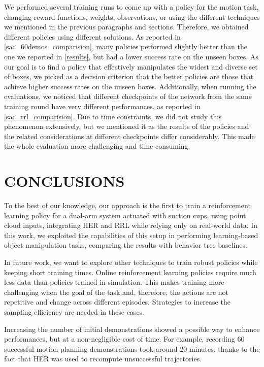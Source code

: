 \documentclass[letterpaper, 10 pt, conference]{ieeeconf}  %
\begin{document}
We performed several training runs to come up with a policy for the motion task, changing reward functions, weights, observations, or using the different techniques we mentioned in the previous paragraphs and sections.
Therefore, we obtained different policies using different solutions.
As reported in \cref{sac_60demos_comparision}, many policies performed slightly better than the one we reported in \cref{results}, but had a lower success rate on the unseen boxes. As our goal is to find a policy that effectively manipulates the widest and diverse set of boxes, we picked as a decision criterion that the better policies are those that achieve higher success rates on the unseen boxes.
Additionally, when running the evaluations, we noticed that different checkpoints of the network from the same training round have very different performances, as reported in \cref{sac_rrl_comparision}. Due to time constraints, we did not study this phenomenon extensively, but we mentioned it as the results of the policies and the related considerations at different checkpoints differ considerably. This made the whole evaluation more challenging and time-consuming. 

\section{CONCLUSIONS}

To the best of our knowledge, our approach is the first to train a reinforcement learning policy for a dual-arm system actuated with suction cups, using point cloud inputs, integrating HER and RRL while relying only on real-world data. In this work, we exploited the capabilities of this setup in performing learning-based object manipulation tasks, comparing the results with behavior tree baselines.

In future work, we want to explore other techniques to train robust policies while keeping short training times. 
Online reinforcement learning policies require much less data than policies trained in simulation. This makes training more challenging when the goal of the task and, therefore, the actions are not repetitive and change across different episodes.
Strategies to increase the sampling efficiency are needed in these cases. 

Increasing the number of initial demonstrations showed a possible way to enhance performances, but at a non-negligible cost of time. For example, recording 60 successful motion planning demonstrations took around 20 minutes, thanks to the fact that HER was used to recompute unsuccessful trajectories.
\end{document}

